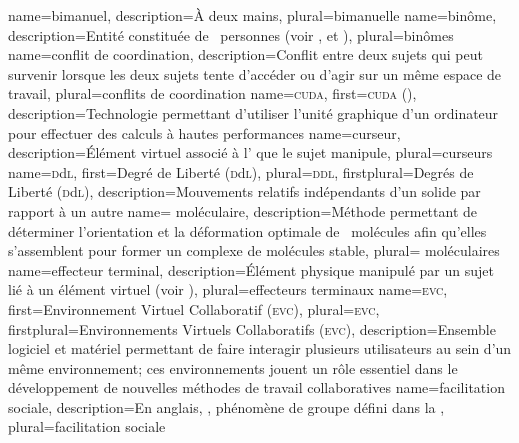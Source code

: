 %
{%
	name={bimanuel},%
	description={À deux mains},%
	plural={bimanuelle}%
}
%
{%
	name={binôme},%
	description={Entité constituée de ~personnes (voir ,  et )},%
	plural={binômes}%
}
%
{%
	name={conflit de coordination},%
	description={Conflit entre deux sujets qui peut survenir lorsque les deux sujets tente d'accéder ou d'agir sur un même espace de travail},
	plural={conflits de coordination}%
}
%
{%
	name={\textsc{cuda}},%
	first={\textsc{cuda} ()},%
	description={Technologie permettant d'utiliser l'unité graphique d'un ordinateur pour effectuer des calculs à hautes performances}%
}
%
{%
	name={curseur},%
	description={Élément virtuel associé à l' que le sujet manipule},%
	plural={curseurs}%
}
%
{%
	name={\textsc{d}d\textsc{l}},%
	first={Degré de Liberté (\textsc{d}d\textsc{l})},%
	plural={\textsc{ddl}},%
	firstplural={Degrés de Liberté (\textsc{d}d\textsc{l})},%
	description={Mouvements relatifs indépendants d'un solide par rapport à un autre}%
}
%
{%
	name={ moléculaire},%
	description={Méthode permettant de déterminer l'orientation et la déformation optimale de ~molécules afin qu'elles s'assemblent pour former un complexe de molécules stable},%
	plural={ moléculaires}%
}
%
{%
	name={effecteur terminal},%
	description={Élément physique manipulé par un sujet lié à un élément virtuel (voir )},%
	plural={effecteurs terminaux}%
}
%
{%
	name={\textsc{evc}},%
	first={Environnement Virtuel Collaboratif (\textsc{evc})},%
	plural={\textsc{evc}},%
	firstplural={Environnements Virtuels Collaboratifs (\textsc{evc})},%
	description={Ensemble logiciel et matériel permettant de faire interagir plusieurs utilisateurs au sein d'un même environnement; ces environnements jouent un rôle essentiel dans le développement de nouvelles méthodes de travail collaboratives}%
}
%
{%
	name={facilitation sociale},%
	description={En anglais, , phénomène de groupe défini dans la },
	plural={facilitation sociale}%
}
%
